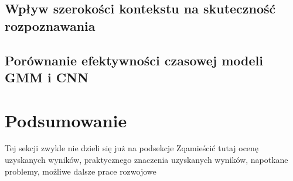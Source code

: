 \documentclass[11pt]{article}
\begin{document}
	\subsection{ Wpływ szerokości kontekstu na skuteczność rozpoznawania }
	\subsection{ Porównanie efektywności czasowej modeli GMM i CNN }

\section{ Podsumowanie }
  Tej sekcji zwykle nie dzieli się już na podsekcje Zqamieścić tutaj ocenę uzyskanych wyników, praktycznego znaczenia uzyskanych wyników, napotkane problemy, możliwe dalsze prace rozwojowe
   
   
	\nocite{*}
	
	
\end{document}
